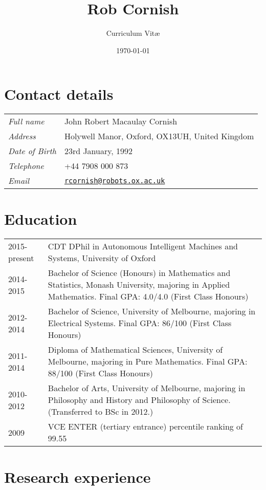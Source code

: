 \documentclass[12pt,a4paper]{article}
\title{\bfseries \huge Rob Cornish}
\author{Curriculum Vit\ae}
\date{\today}
\newcommand{\mailto}[1]{\href{mailto:#1}{\texttt{#1}}}
\newenvironment{llist}
  {\renewcommand{\arraystretch}{1.5}\begin{longtable}{p{3.5cm} p{12cm}}}
  {\end{longtable}}
\begin{document}
\maketitle

\thispagestyle{empty}

\section*{Contact details}
\begin{llist}
  \textit{Full name} & John Robert Macaulay Cornish \\
  \textit{Address} & Holywell Manor, Oxford, OX13UH, United Kingdom\\
  \textit{Date of Birth} & 23rd January, 1992 \\
  \textit{Telephone} & +44 7908 000 873 \\
  \textit{Email} & \mailto{rcornish@robots.ox.ac.uk}
\end{llist}

\section*{Education}

\begin{llist}
  2015-present & CDT DPhil in Autonomous Intelligent Machines and Systems, University of Oxford \\
  2014-2015 & Bachelor of Science (Honours) in Mathematics and Statistics, Monash University,
  majoring in Applied Mathematics. Final GPA: 4.0/4.0 (First Class Honours) \\ 
  2012-2014 & Bachelor of Science, University of Melbourne, majoring in
  Electrical Systems. Final GPA: 86/100 (First Class Honours) \\
  2011-2014 & Diploma of Mathematical Sciences, University of Melbourne,
  majoring in Pure Mathematics. Final GPA: 88/100 (First Class Honours) \\
  2010-2012 & Bachelor of Arts, University of Melbourne, majoring in Philosophy
  and History and Philosophy of Science. (Transferred to BSc in 2012.) \\
  2009 & VCE ENTER (tertiary entrance) percentile ranking of 99.55
\end{llist}

\section*{Research experience}
\end{document}
